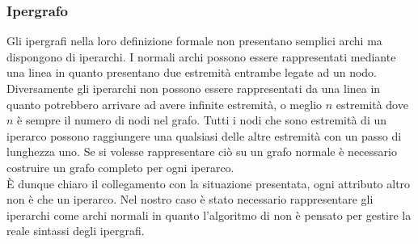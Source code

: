 \subsubsection*{Ipergrafo}
Gli ipergrafi nella loro definizione formale non presentano semplici archi ma dispongono di iperarchi. I normali archi possono essere rappresentati mediante una linea in quanto presentano due estremità entrambe legate ad un nodo. Diversamente gli iperarchi non possono essere rappresentati da una linea in quanto potrebbero arrivare ad avere infinite estremità, o meglio $n$ estremità dove $n$ è sempre il numero di nodi nel grafo. Tutti i nodi che sono estremità di un iperarco possono raggiungere una qualsiasi delle altre estremità con un passo di lunghezza uno. Se si volesse rappresentare ciò su un grafo normale è necessario costruire un grafo completo per ogni iperarco.\\
È dunque chiaro il collegamento con la situazione presentata, ogni attributo altro non è che un iperarco. Nel nostro caso è stato necessario rappresentare gli iperarchi come archi normali in quanto l'algoritmo di \nv non è pensato per gestire la reale sintassi degli ipergrafi.
%
%
